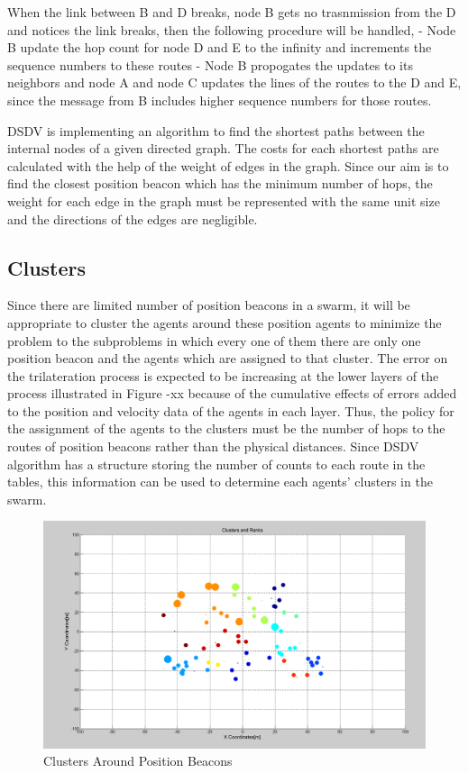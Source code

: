 When the link between B and D breaks, node B gets no trasnmission from the D and notices the link breaks, then the following procedure will be handled,
	- Node B update the hop count for node D and E to the infinity and increments the sequence numbers to these routes 
	- Node B propogates the updates to its neighbors and node A and node C updates the lines of the routes to the D and E, since the message from B includes higher sequence numbers for those routes.
	
DSDV is implementing an algorithm to find the shortest paths between the internal nodes of a given directed graph. The costs for each shortest paths are calculated with the help of the weight of edges in the graph. Since our aim is to find the closest position beacon which has the minimum number of hops, the weight for each edge in the graph must be represented with the same unit size and the directions of the edges are negligible. 

\subsection{Clusters}
Since there are limited number of position beacons in a swarm, it will be appropriate to cluster the agents around these position agents to minimize the problem to the subproblems in which every one of them there are only one position beacon and the agents which are assigned to that cluster. The error on the trilateration process is expected to be increasing at the lower layers of the process illustrated in Figure -xx because of the cumulative effects of errors added to the position and velocity data of the agents in each layer. Thus, the policy for the assignment of the agents to the clusters must be the number of hops to the routes of position beacons rather than the physical distances. Since DSDV algorithm has a structure storing the number of counts to each route in the tables, this information can be used to determine each agents' clusters in the swarm. 

\begin{figure}[H]
\caption{Clusters Around Position Beacons}
\centering
\includegraphics[scale = 0.35]{Clusters_Ranks_2}
\end{figure}

